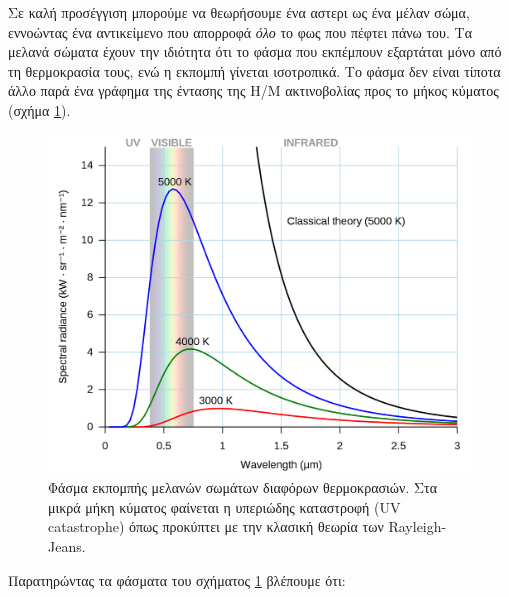 
Σε καλή προσέγγιση μπορούμε να θεωρήσουμε ένα αστερι ως ένα μέλαν σώμα, εννοώντας ένα αντικείμενο που απορροφά \textit{όλο} το φως που πέφτει πάνω του. Τα μελανά σώματα έχουν την ιδιότητα ότι το φάσμα που εκπέμπουν εξαρτάται μόνο από τη θερμοκρασία τους, ενώ η εκπομπή γίνεται ισοτροπικά. Το φάσμα δεν είναι τίποτα άλλο παρά ένα γράφημα της έντασης της Η/Μ ακτινοβολίας προς το μήκος κύματος (σχήμα \ref{fig:black_body_spectrum}).

\begin{figure}[h]
    \centering
    \includegraphics[width=\linewidth]{Figures/black_body_spectrum.png}
    \caption{Φάσμα εκπομπής μελανών σωμάτων διαφόρων θερμοκρασιών. Στα μικρά μήκη κύματος φαίνεται η υπεριώδης καταστροφή (UV catastrophe) όπως προκύπτει με την κλασική θεωρία των Rayleigh-Jeans.}
    \label{fig:black_body_spectrum}
\end{figure}

Παρατηρώντας τα φάσματα του σχήματος \ref{fig:black_body_spectrum} βλέπουμε ότι:

